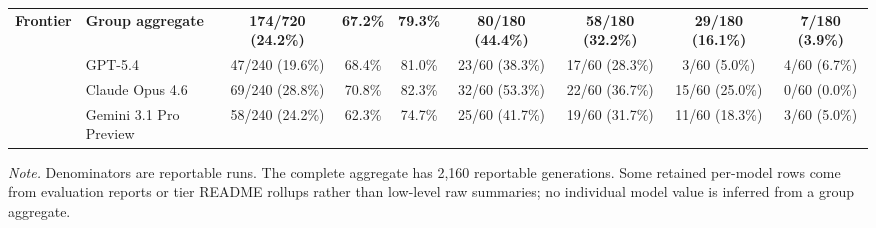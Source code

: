 \begin{table}[t]
{\begin{tabular}{@{}llccccccc@{}}
\midrule
\textbf{Frontier} & \textbf{Group aggregate} & \textbf{174/720 (24.2\%)} & \textbf{67.2\%} & \textbf{79.3\%} & \textbf{80/180 (44.4\%)} & \textbf{58/180 (32.2\%)} & \textbf{29/180 (16.1\%)} & \textbf{7/180 (3.9\%)} \\
& GPT-5.4 & 47/240 (19.6\%) & 68.4\% & 81.0\% & 23/60 (38.3\%) & 17/60 (28.3\%) & 3/60 (5.0\%) & 4/60 (6.7\%) \\
& Claude Opus 4.6 & 69/240 (28.8\%) & 70.8\% & 82.3\% & 32/60 (53.3\%) & 22/60 (36.7\%) & 15/60 (25.0\%) & 0/60 (0.0\%) \\
& Gemini 3.1 Pro Preview & 58/240 (24.2\%) & 62.3\% & 74.7\% & 25/60 (41.7\%) & 19/60 (31.7\%) & 11/60 (18.3\%) & 3/60 (5.0\%) \\
\bottomrule
\end{tabular}%
}
\vspace{2pt}
\footnotesize{\emph{Note.} Denominators are reportable runs. The complete aggregate has 2,160 reportable generations. Some retained per-model rows come from evaluation reports or tier README rollups rather than low-level raw summaries; no individual model value is inferred from a group aggregate.}
\end{table}
